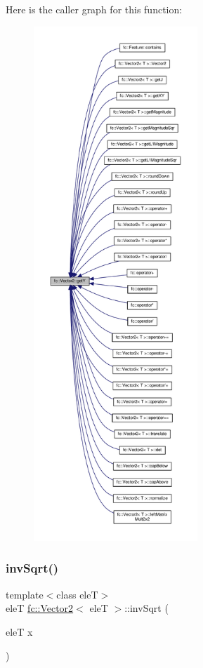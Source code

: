 Here is the caller graph for this function\+:
\nopagebreak
\begin{figure}[H]
\begin{center}
\leavevmode
\includegraphics[height=550pt]{d9/d08/classfc_1_1Vector2_a4f187c16fe4d3260ea890ff17f67d853_icgraph}
\end{center}
\end{figure}
\mbox{\label{classfc_1_1Vector2_a04efdac7c236942670b5a937835b3330}} 
\subsubsection{\texorpdfstring{inv\+Sqrt()}{invSqrt()}}
{\footnotesize\ttfamily template$<$class eleT$>$ \\
eleT \hyperlink{classfc_1_1Vector2}{fc\+::\+Vector2}$<$ eleT $>$\+::inv\+Sqrt (\begin{DoxyParamCaption}\item[{eleT}]{x }\end{DoxyParamCaption})\hspace{0.3cm}{\ttfamily [private]}}




